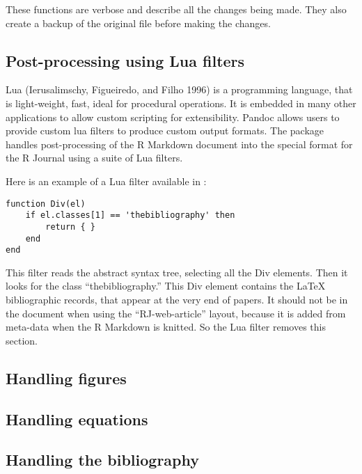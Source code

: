 These functions are verbose and describe all the changes being made. They also create a backup of the original file before making the changes.

\hypertarget{post-processing-using-lua-filters}{%
\subsection{Post-processing using Lua filters}\label{post-processing-using-lua-filters}}

Lua (Ierusalimschy, Figueiredo, and Filho 1996) is a programming language, that is light-weight, fast, ideal for procedural operations. It is embedded in many other applications to allow custom scripting for extensibility. Pandoc allows users to provide custom lua filters to produce custom output formats. The  package handles post-processing of the R Markdown document into the special format for the R Journal using a suite of Lua filters.

Here is an example of a Lua filter available in :

\begin{verbatim}
function Div(el)
    if el.classes[1] == 'thebibliography' then
        return { }
    end
end
\end{verbatim}

This filter reads the abstract syntax tree, selecting all the Div elements. Then it looks for the class ``thebibliography.'' This Div element contains the LaTeX bibliographic records, that appear at the very end of papers. It should not be in the document when using the ``RJ-web-article'' layout, because it is added from meta-data when the R Markdown is knitted. So the Lua filter removes this section.

\hypertarget{handling-figures}{%
\subsection{Handling figures}\label{handling-figures}}

\hypertarget{handling-equations}{%
\subsection{Handling equations}\label{handling-equations}}

\hypertarget{handling-the-bibliography}{%
\subsection{Handling the bibliography}\label{handling-the-bibliography}}

